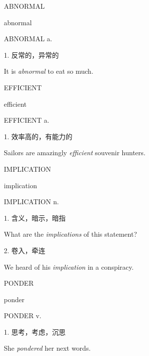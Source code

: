 \begin{flashcard}{
ABNORMAL

abnormal
}
\begin{center}
ABNORMAL a. 
\end{center}
1. 反常的，异常的

It is \textit{abnormal} to eat so much.

\end{flashcard}
\begin{flashcard}{
EFFICIENT

efficient
}
\begin{center}
EFFICIENT a. 
\end{center}
1. 效率高的，有能力的

Sailors are amazingly \textit{efficient} souvenir hunters.

\end{flashcard}
\begin{flashcard}{
IMPLICATION

implication
}
\begin{center}
IMPLICATION n. 
\end{center}
1. 含义，暗示，暗指

What are the \textit{implications} of this statement?

2. 卷入，牵连

We heard of his \textit{implication} in a conspiracy.

\end{flashcard}
\begin{flashcard}{
PONDER

ponder
}
\begin{center}
PONDER v. 
\end{center}
1. 思考，考虑，沉思

She \textit{pondered} her next words.

\end{flashcard}
